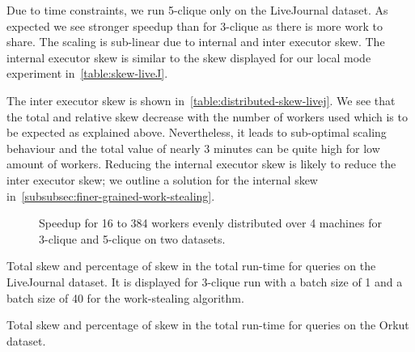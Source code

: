 Due to time constraints, we run 5-clique only on the LiveJournal dataset.
As expected we see stronger speedup than for 3-clique as there is more work to share.
The scaling is sub-linear due to internal and inter executor skew.
The internal executor skew is similar to the skew displayed for our local mode experiment in~\cref{table:skew-liveJ}.

The inter executor skew is shown in~\cref{table:distributed-skew-livej}.
We see that the total and relative skew decrease with the number of workers used which is to be
expected as explained above.
Nevertheless, it leads to sub-optimal scaling behaviour and the total value of nearly 3 minutes
can be quite high for low amount of workers.
Reducing the internal executor skew is likely to reduce the inter executor skew;
we outline a solution for the internal skew in~\cref{subsubsec:finer-grained-work-stealing}.

\begin{figure}
    \subfloat[LiveJournal]{}
    \subfloat[Orkut]{}
    \caption{Speedup for 16 to 384 workers evenly distributed over 4 machines for
      3-clique and 5-clique on two datasets.
    }
    \label{fig:distributed-scaling}
\end{figure}

\begin{table}
    \centering
    \resizebox{\textwidth}{!}{%
        
    }
    \caption{Total skew and percentage of skew in the total run-time for queries on the LiveJournal dataset.
        It is displayed for 3-clique run with a batch size of 1 and a batch size of 40 for the work-stealing
        algorithm.
    }
    \label{table:distributed-skew-livej}
\end{table}

\begin{table}
    \centering
    \resizebox{\textwidth}{!}{%
        
    }
    \caption{Total skew and percentage of skew in the total run-time for queries on the Orkut dataset.
    }

    \label{table:distributed-skew-orkut}
\end{table}


